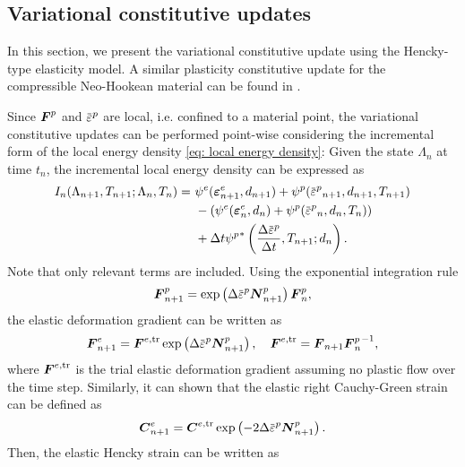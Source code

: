 \subsection{Variational constitutive updates}

In this section, we present the variational constitutive update using the Hencky-type elasticity model. A similar plasticity constitutive update for the compressible Neo-Hookean material can be found in \cite{borden2016phase}.

Since $\boldsymbol{F}^p$ and $\ep$ are local, i.e. confined to a material point, the variational constitutive updates can be performed point-wise considering the incremental form of the local energy density \eqref{eq: local energy density}: Given the state $\Lambda_n$ at time $t_n$, the incremental local energy density can be expressed as
\begin{equation}
  \begin{aligned}
    I_n(\Lambda_{n+1}, T_{n+1}; \Lambda_n, T_n) = & \ \psi^e(\strain^e_{n+1}, d_{n+1}) + \psi^p(\ep_{n+1}, d_{n+1}, T_{n+1})            \\
                                                  & \ - \left( \psi^e(\strain^e_n, d_n) + \psi^p(\ep_n, d_n, T_n) \right)               \\
                                                  & \ + \Delta t {\psi^p}^*\left( \dfrac{\Delta \ep}{\Delta t}, T_{n+1}; d_{n} \right). 
  \end{aligned}
\end{equation}
Note that only relevant terms are included. Using the exponential integration rule \cite{weber1990finite}
\begin{align}
  \defgrad^p_{n+1} = \exp\left( \Delta\ep \bfN^p_{n+1} \right) \defgrad^p_n,
\end{align}
the elastic deformation gradient can be written as
\begin{align}
  \defgrad^e_{n+1} = \defgrad^{e,\text{tr}}\exp\left( \Delta\ep \bfN^p_{n+1} \right), \quad \defgrad^{e,\text{tr}} = \defgrad_{n+1} {\defgrad^p_n}^{-1},
\end{align}
where $\boldsymbol{F}^{e,\text{tr}}$ is the trial elastic deformation gradient assuming no plastic flow over the time step. Similarly, it can shown that the elastic right Cauchy-Green strain can be defined as
\begin{align}
  \bfC^e_{n+1} = \bfC^{e,\text{tr}} \exp\left( -2\Delta\ep\bfN^p_{n+1} \right).
\end{align}
Then, the elastic Hencky strain can be written as
